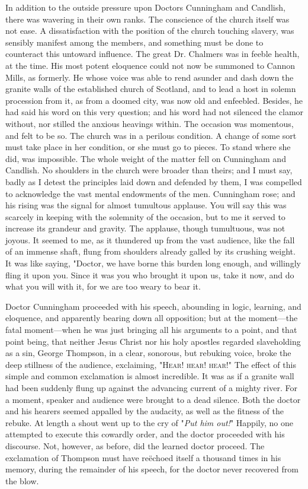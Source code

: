 In addition to the outside pressure upon Doctors Cunningham and
Candlish, there was wavering in their own ranks. The conscience of the
church itself was not ease. A dissatisfaction with the position of the
church touching slavery, was sensibly manifest among the members, and
something must be done to counteract this untoward influence. The great
Dr. Chalmers was in feeble health, at the time. His most potent
eloquence could not now be summoned to Cannon Mills, as formerly. He
whose voice was able to rend asunder and dash down the granite walls of
the established church of Scotland, and to lead a host in solemn
procession from it, as from a doomed city, was now old and enfeebled.
Besides, he had said his word on this very question; and his word had
not silenced the clamor without, nor stilled the anxious heavings
within. The occasion was momentous, and felt to be so. The church was in
a perilous condition. A change of some sort must take place in her
condition, or she must go to pieces. To stand where she did, was
impossible. The whole weight of the matter fell on Cunningham and
Candlish. No shoulders in the church were broader than theirs; and I
must say, badly as I detest the principles laid down and defended by
them, I was compelled to acknowledge the vast mental endowments of the
men. {}Cunningham rose; and his rising was the signal for almost
tumultous applause. You will say this was scarcely in keeping with the
solemnity of the occasion, but to me it served to increase its grandeur
and gravity. The applause, though tumultuous, was not joyous. It seemed
to me, as it thundered up from the vast audience, like the fall of an
immense shaft, flung from shoulders already galled by its crushing
weight. It was like saying, "Doctor, we have borne this burden long
enough, and willingly fling it upon you. Since it was you who brought it
upon us, take it now, and do what you will with it, for we are too weary
to bear it.

Doctor Cunningham proceeded with his speech, abounding in logic,
learning, and eloquence, and apparently bearing down all opposition; but
at the moment---the fatal moment---when he was just bringing all his
arguments to a point, and that point being, that neither Jesus Christ
nor his holy apostles regarded slaveholding as a sin, George Thompson,
in a clear, sonorous, but rebuking voice, broke the deep stillness of
the audience, exclaiming, "\textsc{Hear! hear! hear}!" The effect of
this simple and common exclamation is almost incredible. It was as if a
granite wall had been suddenly flung up against the advancing current of
a mighty river. For a moment, speaker and audience were brought to a
dead silence. Both the doctor and his hearers seemed appalled by the
audacity, as well as the fitness of the rebuke. At length a shout went
up to the cry of "\emph{Put him out!}" Happily, no one attempted to
execute this cowardly order, and the doctor proceeded with his
discourse. {}Not, however, as before, did the learned doctor proceed.
The exclamation of Thompson must have reëchoed itself a thousand times
in his memory, during the remainder of his speech, for the doctor never
recovered from the blow.

